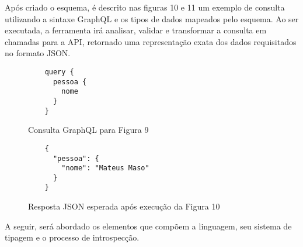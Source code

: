 Após criado o esquema, é descrito nas figuras 10 e 11 um exemplo de consulta utilizando a sintaxe GraphQL e os tipos de dados mapeados pelo esquema. Ao ser executada, a ferramenta irá analisar, validar e transformar a consulta em chamadas para a API, retornado uma representação exata dos dados requisitados no formato JSON. \cite{Facebook2016}

\begin{figure}[H]
  \centering
  \begin{verbatim}
    query {
      pessoa {
        nome
      }
    }
  \end{verbatim}
  \caption{Consulta GraphQL para Figura 9}
\end{figure}

\begin{figure}[H]
  \centering
  \begin{verbatim}
    {
      "pessoa": {
        "nome": "Mateus Maso"
      }
    }
  \end{verbatim}
  \caption{Resposta JSON esperada após execução da Figura 10}
\end{figure}

A seguir, será abordado os elementos que compõem a linguagem, seu sistema de tipagem e o processo de introspecção.




